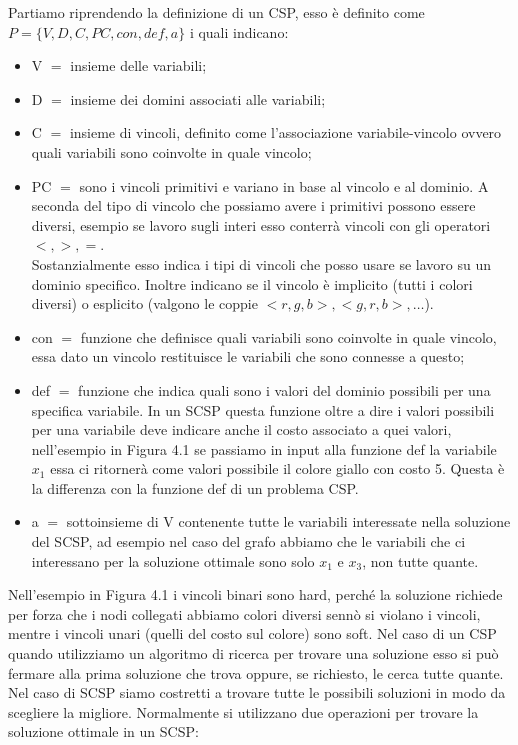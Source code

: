 Partiamo riprendendo la definizione di un CSP, esso è definito come
$P=\{V,D,C,PC,con,def,a\}$ i quali indicano:
\begin{itemize}
    \item V $=$ insieme delle variabili;
    \item D $=$ insieme dei domini associati alle variabili;
    \item C $=$ insieme di vincoli, definito come l'associazione
          variabile-vincolo ovvero quali variabili sono coinvolte in quale vincolo;
    \item PC $=$ sono i vincoli primitivi e variano in base al vincolo e al
          dominio. A seconda del tipo di vincolo che possiamo avere i primitivi
          possono essere diversi, esempio se lavoro sugli interi esso conterrà
          vincoli con gli operatori $<,>,=$. \\Sostanzialmente esso indica i
          tipi di vincoli che posso usare se lavoro su un dominio specifico.
          Inoltre indicano se il vincolo è implicito (tutti i colori diversi) o
          esplicito (valgono le coppie $<r,g,b>, <g,r,b>, \ldots$).
    \item con $=$ funzione che definisce quali variabili sono coinvolte in quale
          vincolo, essa dato un vincolo restituisce le variabili che sono connesse a
          questo;
    \item def $=$ funzione che indica quali sono i valori del dominio possibili
          per una specifica variabile. In un SCSP questa funzione oltre a dire i
          valori possibili per una variabile deve indicare anche il costo associato a
          quei valori, nell'esempio in Figura 4.1 se passiamo in input alla funzione
          def la variabile $x_1$ essa ci ritornerà come valori possibile il colore giallo
          con costo 5. Questa è la differenza con la funzione def di un problema CSP.
    \item a $=$ sottoinsieme di V contenente tutte le variabili interessate
          nella soluzione del SCSP, ad esempio nel caso del grafo abbiamo che le
          variabili che ci interessano per la soluzione ottimale sono solo $x_1$ e
          $x_3$, non tutte quante.
\end{itemize}
Nell'esempio in Figura 4.1 i vincoli binari sono hard, perché la soluzione
richiede per forza che i nodi collegati abbiamo colori diversi sennò si violano
i vincoli, mentre i vincoli unari (quelli del costo sul colore) sono soft. Nel
caso di un CSP quando utilizziamo un algoritmo di ricerca per trovare una
soluzione esso si può fermare alla prima soluzione che trova oppure, se
richiesto, le cerca tutte quante. Nel caso di SCSP siamo costretti a trovare
tutte le possibili soluzioni in modo da scegliere la migliore. Normalmente si
utilizzano due operazioni per trovare la soluzione ottimale in un SCSP:

